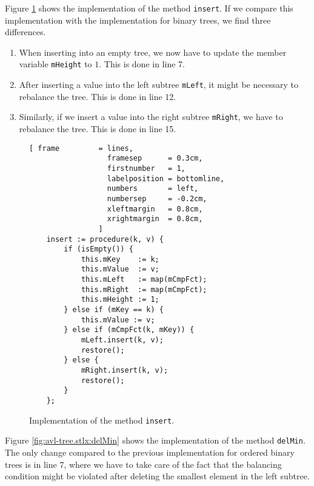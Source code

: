 Figure \ref{fig:avl-tree.stlx:insert} shows the implementation of the method \texttt{insert}.
If we compare this implementation with the implementation for binary trees, we find three
differences.
\begin{enumerate}
\item When inserting into an empty tree, we now have to update the member variable \texttt{mHeight}
      to $1$.  This is done in line 7.
\item After inserting a value into the left subtree \texttt{mLeft}, it might be necessary to 
      rebalance the tree.  This is done in line 12.
\item Similarly, if we insert a value into the right subtree \texttt{mRight}, we have to rebalance 
      the tree.  This is done in line 15.
\end{enumerate}

\begin{figure}[!ht]
\centering
\begin{Verbatim}[ frame         = lines, 
                  framesep      = 0.3cm, 
                  firstnumber   = 1,
                  labelposition = bottomline,
                  numbers       = left,
                  numbersep     = -0.2cm,
                  xleftmargin   = 0.8cm,
                  xrightmargin  = 0.8cm,
                ]
    insert := procedure(k, v) {
        if (isEmpty()) { 
            this.mKey    := k;
            this.mValue  := v; 
            this.mLeft   := map(mCmpFct);
            this.mRight  := map(mCmpFct);
            this.mHeight := 1;
        } else if (mKey == k) { 
            this.mValue := v; 
        } else if (mCmpFct(k, mKey)) { 
            mLeft.insert(k, v); 
            restore();
        } else { 
            mRight.insert(k, v); 
            restore();
        }
    };
\end{Verbatim}
\vspace*{-0.3cm}
\caption{Implementation of the method \texttt{insert}.}
\label{fig:avl-tree.stlx:insert}
\end{figure}

Figure \ref{fig:avl-tree.stlx:delMin} shows the implementation of the method \texttt{delMin}.
The only change compared to the previous implementation for ordered binary trees is in line 7, where
we have to take care of the fact that the balancing condition might be violated after deleting the
smallest element in the left subtree.

